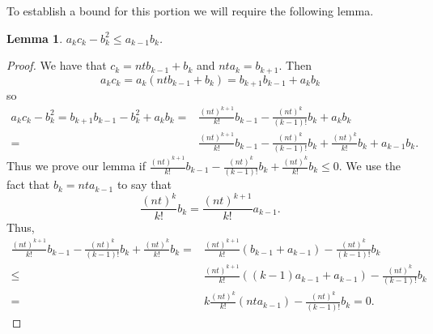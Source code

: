 \documentclass[12pt]{amsart}
\newtheorem{lemma}[theorem]{Lemma}
\theoremstyle{remark}
\begin{document}
To establish a bound for this portion we will require the following lemma.
\begin{lemma}\label{ac-b2}
$a_kc_k-b_k^2\le a_{k-1}b_k$.
\end{lemma}
\begin{proof}
We have that $c_k=ntb_{k-1}+b_k$ and $nta_k=b_{k+1}$.  Then
\[a_kc_k=a_k(ntb_{k-1}+b_k)=b_{k+1}b_{k-1}+a_kb_k\]
so
\begin{align*}a_kc_k-b_k^2=b_{k+1}b_{k-1}-b_k^2+a_kb_k=&\frac{(nt)^{k+1}}{k!}b_{k-1}-\frac{(nt)^{k}}{(k-1)!}b_k+a_kb_k
\\=&\frac{(nt)^{k+1}}{k!}b_{k-1}-\frac{(nt)^{k}}{(k-1)!}b_k+\frac{(nt)^k}{k!}b_k+a_{k-1}b_k.
\end{align*}
Thus we prove our lemma if $\frac{(nt)^{k+1}}{k!}b_{k-1}-\frac{(nt)^{k}}{(k-1)!}b_k+\frac{(nt)^k}{k!}b_k\le0$.  We use the fact that $b_k=nta_{k-1}$ to say that
\[\frac{(nt)^k}{k!}b_k=\frac{(nt)^{k+1}}{k!}a_{k-1}.\]
Thus,
\begin{align*}\frac{(nt)^{k+1}}{k!}b_{k-1}-\frac{(nt)^{k}}{(k-1)!}b_k+\frac{(nt)^k}{k!}b_k=&\frac{(nt)^{k+1}}{k!}(b_{k-1}+a_{k-1})-\frac{(nt)^{k}}{(k-1)!}b_k
\\\le&\frac{(nt)^{k+1}}{k!}((k-1)a_{k-1}+a_{k-1})-\frac{(nt)^{k}}{(k-1)!}b_k
\\=&k\frac{(nt)^{k}}{k!}(nta_{k-1})-\frac{(nt)^{k}}{(k-1)!}b_k=0.
\end{align*}
\end{proof}
\end{document}
